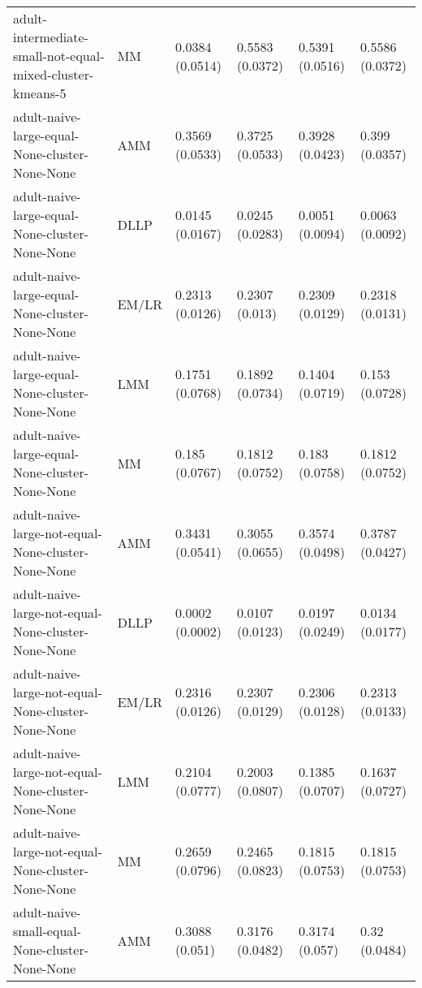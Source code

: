 \begin{tabular}{llllll}
                              adult-intermediate-small-not-equal-mixed-cluster-kmeans-5 &        MM & 0.0384 (0.0514) &  0.5583 (0.0372) &   0.5391 (0.0516) &     0.5586 (0.0372) \\
                                         adult-naive-large-equal-None-cluster-None-None &       AMM & 0.3569 (0.0533) &  0.3725 (0.0533) &   0.3928 (0.0423) &      0.399 (0.0357) \\
                                         adult-naive-large-equal-None-cluster-None-None &      DLLP & 0.0145 (0.0167) &  0.0245 (0.0283) &   0.0051 (0.0094) &     0.0063 (0.0092) \\
                                         adult-naive-large-equal-None-cluster-None-None &     EM/LR & 0.2313 (0.0126) &   0.2307 (0.013) &   0.2309 (0.0129) &     0.2318 (0.0131) \\
                                         adult-naive-large-equal-None-cluster-None-None &       LMM & 0.1751 (0.0768) &  0.1892 (0.0734) &   0.1404 (0.0719) &      0.153 (0.0728) \\
                                         adult-naive-large-equal-None-cluster-None-None &        MM &  0.185 (0.0767) &  0.1812 (0.0752) &    0.183 (0.0758) &     0.1812 (0.0752) \\
                                     adult-naive-large-not-equal-None-cluster-None-None &       AMM & 0.3431 (0.0541) &  0.3055 (0.0655) &   0.3574 (0.0498) &     0.3787 (0.0427) \\
                                     adult-naive-large-not-equal-None-cluster-None-None &      DLLP & 0.0002 (0.0002) &  0.0107 (0.0123) &   0.0197 (0.0249) &     0.0134 (0.0177) \\
                                     adult-naive-large-not-equal-None-cluster-None-None &     EM/LR & 0.2316 (0.0126) &  0.2307 (0.0129) &   0.2306 (0.0128) &     0.2313 (0.0133) \\
                                     adult-naive-large-not-equal-None-cluster-None-None &       LMM & 0.2104 (0.0777) &  0.2003 (0.0807) &   0.1385 (0.0707) &     0.1637 (0.0727) \\
                                     adult-naive-large-not-equal-None-cluster-None-None &        MM & 0.2659 (0.0796) &  0.2465 (0.0823) &   0.1815 (0.0753) &     0.1815 (0.0753) \\
                                         adult-naive-small-equal-None-cluster-None-None &       AMM &  0.3088 (0.051) &  0.3176 (0.0482) &    0.3174 (0.057) &       0.32 (0.0484) \\

\end{tabular}
